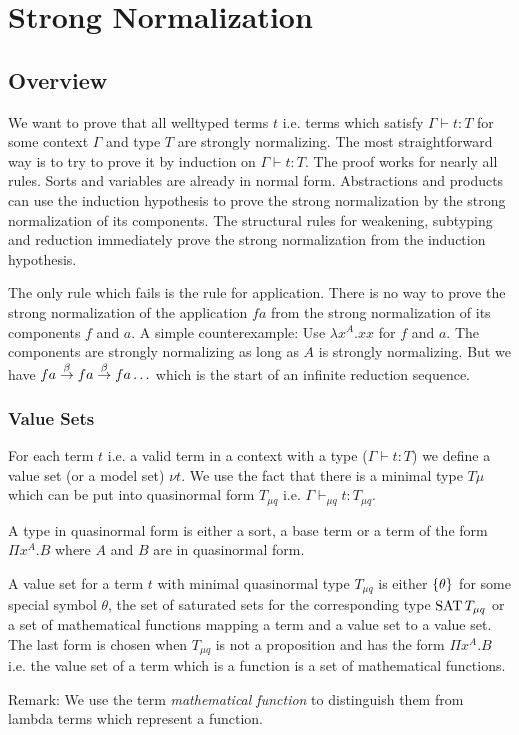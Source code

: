 \section{Strong Normalization}


\subsection{Overview}

We want to prove that all welltyped terms $t$ i.e. terms which satisfy $\Gamma
\vdash t: T$ for some context $\Gamma$ and type $T$ are strongly normalizing.
The most straightforward way is to try to prove it by induction on $\Gamma
\vdash t: T$. The proof works for nearly all rules. Sorts and variables are
already in normal form. Abstractions and products can use the induction
hypothesis to prove the strong normalization by the strong normalization of its
components. The structural rules for weakening, subtyping and reduction
immediately prove the strong normalization from the induction hypothesis.

The only rule which fails is the rule for application. There is no way to prove
the strong normalization of the application $f a$ from the strong normalization
of its components $f$ and $a$. A simple counterexample: Use $\lambda x^A. x x$
for $f$ and $a$. The components are strongly normalizing as long as $A$ is
strongly normalizing. But we have $f a \stackrel{\beta}{\to} f a \stackrel{\beta}{\to} f a \ldots$ which is
the start of an infinite reduction sequence.



\subsubsection{Value Sets}

For each term $t$ i.e. a valid term in a context with a type ($\Gamma \vdash t:
T$) we define a value set (or a model set) $\nu t$. We use the fact that there
is a minimal type $T\mu$ which can be put into quasinormal form $T_{\mu q}$ i.e.
$\Gamma \vdash_{\mu q} t: T_{\mu q}$.

A type in quasinormal form is either a sort, a base term or a term of the form
$\Pi x^A. B$ where $A$ and $B$ are in quasinormal form.

A value set for a term $t$ with minimal quasinormal type $T_{\mu q}$ is either
${\{\theta\}}$ for some special symbol $\theta$, the set of saturated sets for
the corresponding type $\text{SAT}\, T_{\mu q}$ or a set of mathematical functions
mapping a term and a value set to a value set. The last form is chosen when
$T_{\mu q}$ is not a proposition and has the form $\Pi x^A. B$ i.e. the value
set of a term which is a function is a set of mathematical functions.

Remark: We use the term \emph{mathematical function} to distinguish them from
lambda terms which represent a function.





